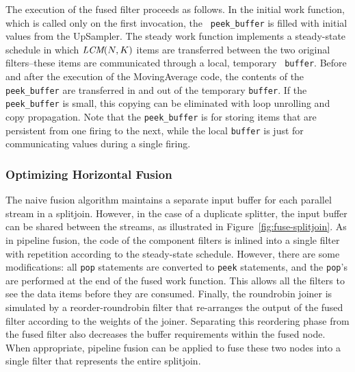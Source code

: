 The execution of the fused filter proceeds as follows.  In the initial
work function, which is called only on the first invocation, the {\tt
peek\_buffer} is filled with initial values from the UpSampler.  The
steady work function implements a steady-state schedule in which
$\mbox{\it LCM}(N, K)$ items are transferred between the two original
filters--these items are communicated through a local, temporary {\tt
buffer}.  Before and after the execution of the MovingAverage code,
the contents of the {\tt peek\_buffer} are transferred in and out of
the temporary {\tt buffer}.  If the {\tt peek\_buffer} is small, this
copying can be eliminated with loop unrolling and copy propagation.
Note that the {\tt peek\_buffer} is for storing items that are
persistent from one firing to the next, while the local {\tt buffer}
is just for communicating values during a single firing.

\subsubsection{Optimizing Horizontal Fusion}

The naive fusion algorithm maintains a separate input buffer for each
parallel stream in a splitjoin.  However, in the case of a duplicate
splitter, the input buffer can be shared between the streams, as
illustrated in Figure~\ref{fig:fuse-splitjoin}.  As in pipeline
fusion, the code of the component filters is inlined into a single
filter with repetition according to the steady-state schedule.
However, there are some modifications: all {\tt pop} statements are
converted to {\tt peek} statements, and the {\tt pop}'s are performed
at the end of the fused work function.  This allows all the filters to
see the data items before they are consumed.  Finally, the roundrobin
joiner is simulated by a reorder-roundrobin filter that re-arranges
the output of the fused filter according to the weights of the joiner.
Separating this reordering phase from the fused filter also decreases
the buffer requirements within the fused node.  When appropriate,
pipeline fusion can be applied to fuse these two nodes into a single
filter that represents the entire splitjoin.

